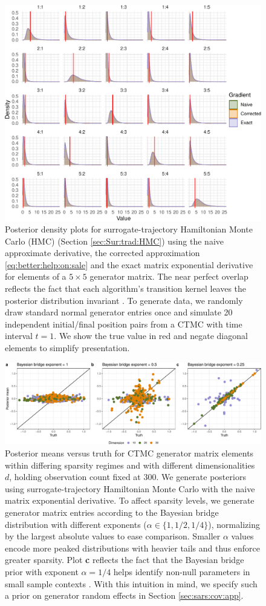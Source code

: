 \documentclass[12pt]{article}
\begin{document}
\setcounter{figure}{1}
\begin{figure}[!ht]
	\centering
	\includegraphics[width=0.6\linewidth]{figures/lowDimVis.pdf}
	\caption{Posterior density plots for surrogate-trajectory Hamiltonian Monte Carlo (HMC) (Section \ref{sec:Sur:trad:HMC}) using the naive approximate derivative, the corrected approximation \eqref{eq:better:help:on:sale} and the exact matrix exponential derivative for elements of a $5\times 5$ generator matrix. The near perfect overlap reflects the fact that each algorithm's transition kernel leaves the posterior distribution invariant \cite{glatt2020accept}.  To generate data, we randomly draw standard normal generator entries once and simulate 20 independent initial/final position pairs from a CTMC with time interval $t=1$.  We show the true value in red and negate diagonal elements to simplify presentation.  }\label{fig:lowDim}
\end{figure}

\begin{figure}[!t]
	\centering
	\includegraphics[width=\linewidth]{figures/truthMeanFig.pdf}
	\caption{Posterior means versus truth for CTMC generator matrix elements within differing sparsity regimes and with different dimensionalities $d$, holding observation count fixed at 300. We generate posteriors using surrogate-trajectory Hamiltonian Monte Carlo with the naive matrix exponential derivative.  To affect sparsity levels, we generate generator matrix entries according to the Bayesian bridge distribution \citep{polson2014bayesian} with different exponents ($\alpha \in \{1,1/2,1/4\}$), normalizing by the largest absolute values to ease comparison. Smaller $\alpha$ values encode more peaked distributions with heavier tails and thus enforce greater sparsity.   Plot \textbf{c} reflects the fact that the Bayesian bridge prior with exponent $\alpha=1/4$ helps identify non-null parameters in small sample contexts \citep{magee2023random}.  With this intuition in mind, we specify such a prior on generator random effects in Section \ref{sec:sars:cov:app}.}
	\label{fig:truthMean}
\end{figure}
\end{document}
